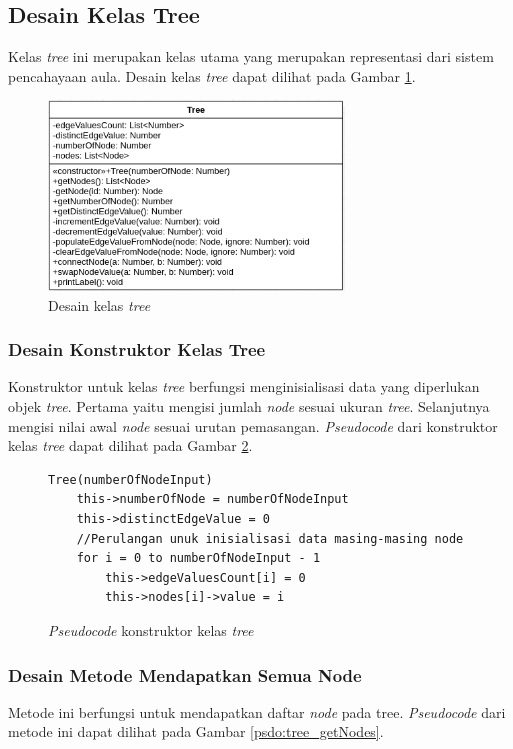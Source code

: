 \subsection{Desain Kelas Tree}\label{desain_kelas_tree}
Kelas \textit{tree} ini merupakan kelas utama yang merupakan representasi dari sistem pencahayaan aula. Desain kelas \textit{tree} dapat dilihat pada Gambar \ref{fig:class_tree}.

\begin{figure}[ht]
	\centering\includegraphics[width=0.7\textwidth]{bab3/figures/class_tree.png}
	\caption{Desain kelas \textit{tree}}
	\label{fig:class_tree}
\end{figure}

\subsubsection{Desain Konstruktor Kelas Tree}
Konstruktor untuk kelas \textit{tree} berfungsi menginisialisasi data yang diperlukan objek \textit{tree}. Pertama yaitu mengisi jumlah \textit{node} sesuai ukuran \textit{tree}. Selanjutnya mengisi nilai awal \textit{node} sesuai urutan pemasangan. \textit{Pseudocode} dari konstruktor kelas \textit{tree} dapat dilihat pada Gambar \ref{psdo:tree_constructor}.

\begin{figure}[ht]
	\begin{lstlisting}[firstnumber=0]
	Tree(numberOfNodeInput)
	this->numberOfNode = numberOfNodeInput
	this->distinctEdgeValue = 0
	//Perulangan unuk inisialisasi data masing-masing node
	for i = 0 to numberOfNodeInput - 1
		this->edgeValuesCount[i] = 0
		this->nodes[i]->value = i
	\end{lstlisting}
	\caption{\textit{Pseudocode} konstruktor kelas \textit{tree}}
	\label{psdo:tree_constructor}
\end{figure}

\subsubsection{Desain Metode Mendapatkan Semua Node}
Metode ini berfungsi untuk mendapatkan daftar \textit{node} pada tree. \textit{Pseudocode} dari metode ini dapat dilihat pada Gambar \ref{psdo:tree_getNodes}.

